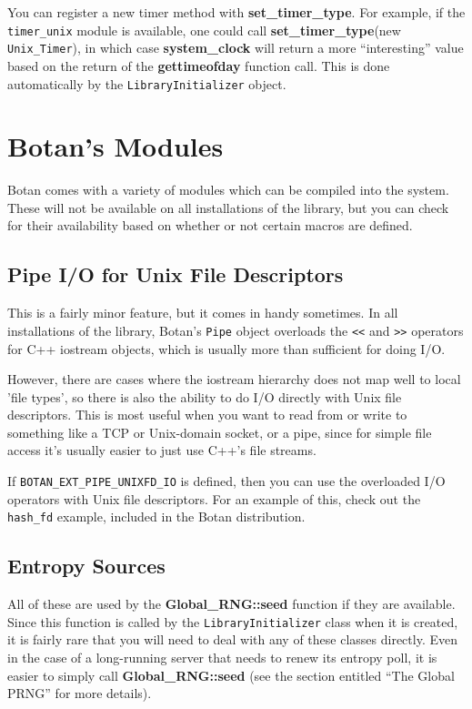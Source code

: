 \documentclass{article}
\newcommand{\filename}[1]{\texttt{#1}}
\newcommand{\macro}[1]{\texttt{#1}}
\newcommand{\function}[1]{\textbf{#1}}
\newcommand{\keyword}[1]{\texttt{#1}}
\newcommand{\type}[1]{\texttt{#1}}
\begin{document}
You can register a new timer method with \function{set\_timer\_type}. For
example, if the \texttt{timer\_unix} module is available, one could call
\function{set\_timer\_type}(new \type{Unix\_Timer}), in which case
\function{system\_clock} will return a more ``interesting'' value based on the
return of the \function{gettimeofday} function call. This is done automatically
by the \type{LibraryInitializer} object.

\pagebreak

\section{Botan's Modules}

Botan comes with a variety of modules which can be compiled into the system.
These will not be available on all installations of the library, but you can
check for their availability based on whether or not certain macros are
defined.

\subsection{Pipe I/O for Unix File Descriptors}

This is a fairly minor feature, but it comes in handy sometimes. In all
installations of the library, Botan's \type{Pipe} object overloads the
\keyword{<<} and \keyword{>>} operators for C++ iostream objects, which is
usually more than sufficient for doing I/O.

However, there are cases where the iostream hierarchy does not map well to
local 'file types', so there is also the ability to do I/O directly with Unix
file descriptors. This is most useful when you want to read from or write to
something like a TCP or Unix-domain socket, or a pipe, since for simple file
access it's usually easier to just use C++'s file streams.

If \macro{BOTAN\_EXT\_PIPE\_UNIXFD\_IO} is defined, then you can use the
overloaded I/O operators with Unix file descriptors. For an example of this,
check out the \filename{hash\_fd} example, included in the Botan distribution.

\subsection{Entropy Sources}

All of these are used by the \function{Global\_RNG::seed} function if they are
available. Since this function is called by the \type{LibraryInitializer} class
when it is created, it is fairly rare that you will need to deal with any of
these classes directly. Even in the case of a long-running server that needs to
renew its entropy poll, it is easier to simply call
\function{Global\_RNG::seed} (see the section entitled ``The Global PRNG'' for
more details).
\end{document}
